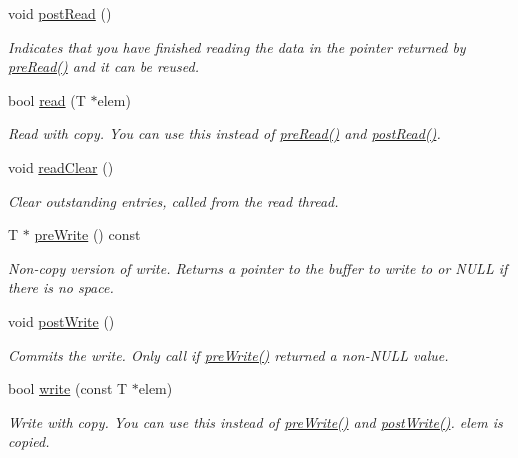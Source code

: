\begin{DoxyCompactItemize}
void \mbox{\hyperlink{class_ring_buffer_aad9eebd3dc4cc774666467de89c6de86}{post\+Read}} ()
\begin{DoxyCompactList}\small\item\em Indicates that you have finished reading the data in the pointer returned by \mbox{\hyperlink{class_ring_buffer_a724ce39b381489539fda406e06596a1d}{pre\+Read()}} and it can be reused. \end{DoxyCompactList}\item 
bool \mbox{\hyperlink{class_ring_buffer_af4ab31038d40a4075f4f23b7f2c970cd}{read}} (T $\ast$elem)
\begin{DoxyCompactList}\small\item\em Read with copy. You can use this instead of \mbox{\hyperlink{class_ring_buffer_a724ce39b381489539fda406e06596a1d}{pre\+Read()}} and \mbox{\hyperlink{class_ring_buffer_aad9eebd3dc4cc774666467de89c6de86}{post\+Read()}}. \end{DoxyCompactList}\item 
\mbox{\label{class_ring_buffer_a5f17853814de662a9f15a14fddfea4bf}} 
void \mbox{\hyperlink{class_ring_buffer_a5f17853814de662a9f15a14fddfea4bf}{read\+Clear}} ()
\begin{DoxyCompactList}\small\item\em Clear outstanding entries, called from the read thread. \end{DoxyCompactList}\item 
T $\ast$ \mbox{\hyperlink{class_ring_buffer_a60177190baecb3c438f8392d6f9a35f7}{pre\+Write}} () const
\begin{DoxyCompactList}\small\item\em Non-\/copy version of write. Returns a pointer to the buffer to write to or N\+U\+LL if there is no space. \end{DoxyCompactList}\item 
\mbox{\label{class_ring_buffer_a7d2e2f6098053c51451ff2bd35fa2252}} 
void \mbox{\hyperlink{class_ring_buffer_a7d2e2f6098053c51451ff2bd35fa2252}{post\+Write}} ()
\begin{DoxyCompactList}\small\item\em Commits the write. Only call if \mbox{\hyperlink{class_ring_buffer_a60177190baecb3c438f8392d6f9a35f7}{pre\+Write()}} returned a non-\/\+N\+U\+LL value. \end{DoxyCompactList}\item 
bool \mbox{\hyperlink{class_ring_buffer_a1a9e393325923ed035b16a5b067a3951}{write}} (const T $\ast$elem)
\begin{DoxyCompactList}\small\item\em Write with copy. You can use this instead of \mbox{\hyperlink{class_ring_buffer_a60177190baecb3c438f8392d6f9a35f7}{pre\+Write()}} and \mbox{\hyperlink{class_ring_buffer_a7d2e2f6098053c51451ff2bd35fa2252}{post\+Write()}}. elem is copied. \end{DoxyCompactList}\end{DoxyCompactItemize}


